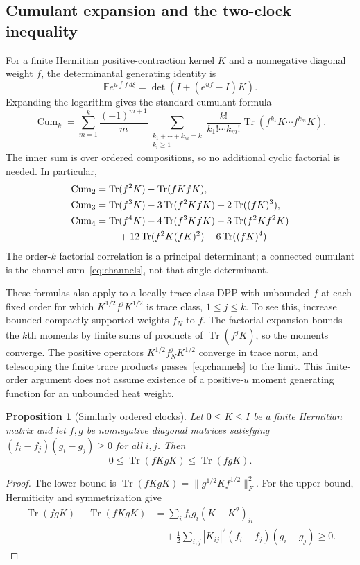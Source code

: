 \documentclass[11pt,a4paper]{article}
\newtheorem{proposition}[theorem]{Proposition}
\theoremstyle{remark}\newtheorem{remark}[theorem]{Remark}
\newcommand{\E}{\mathbb E}
\newcommand{\Tr}{\operatorname{Tr}}
\newcommand{\Cum}{\operatorname{Cum}}
\begin{document}
\subsection{Cumulant expansion and the two-clock inequality}
For a finite Hermitian positive-contraction kernel $K$ and a nonnegative diagonal weight $f$, the determinantal generating identity is
\begin{equation}
 \E e^{u\int f\,d\xi}=\det(I+(e^{uf}-I)K).
\end{equation}
Expanding the logarithm gives the standard cumulant formula~\citep{Soshnikov2000}
\begin{equation}\label{eq:channels}
 \Cum_k=\sum_{m=1}^k\frac{(-1)^{m+1}}m
 \sum_{\substack{k_1+\cdots+k_m=k\\k_i\ge1}}
 \frac{k!}{k_1!\cdots k_m!}
 \Tr(f^{k_1}K\cdots f^{k_m}K).
\end{equation}
The inner sum is over ordered compositions, so no additional cyclic factorial is needed.
In particular,
\begin{align}
 \Cum_2&=\Tr(f^2K)-\Tr(fKfK),\\
 \Cum_3&=\Tr(f^3K)-3\Tr(f^2KfK)+2\Tr((fK)^3),\\
 \Cum_4&=\Tr(f^4K)-4\Tr(f^3KfK)-3\Tr(f^2Kf^2K)\nonumber\\
 &\hspace{8mm}+12\Tr(f^2K(fK)^2)-6\Tr((fK)^4).
\end{align}
The order-$k$ factorial correlation is a principal determinant; a connected cumulant is the channel sum~\eqref{eq:channels}, not that single determinant.

These formulas also apply to a locally trace-class DPP with unbounded $f$ at each fixed order for which $K^{1/2}f^jK^{1/2}$ is trace class, $1\le j\le k$.
To see this, increase bounded compactly supported weights $f_N$ to $f$.
The factorial expansion bounds the $k$th moments by finite sums of products of $\Tr(f^jK)$, so the moments converge.
The positive operators $K^{1/2}f_N^jK^{1/2}$ converge in trace norm, and telescoping the finite trace products passes~\eqref{eq:channels} to the limit.
This finite-order argument does not assume existence of a positive-$u$ moment generating function for an unbounded heat weight.

\begin{proposition}[Similarly ordered clocks]\label{prop:ordered}
Let $0\le K\le I$ be a finite Hermitian matrix and let $f,g$ be nonnegative diagonal matrices satisfying $(f_i-f_j)(g_i-g_j)\ge0$ for all $i,j$.
Then
\begin{equation}\label{eq:ordered}
 0\le\Tr(fKgK)\le\Tr(fgK).
\end{equation}
\end{proposition}
\begin{proof}
The lower bound is $\Tr(fKgK)=\|g^{1/2}Kf^{1/2}\|_F^2$.
For the upper bound, Hermiticity and symmetrization give
\begin{align}
 \Tr(fgK)-\Tr(fKgK)
 &=\sum_i f_ig_i(K-K^2)_{ii}\nonumber\\
 &\quad+\frac12\sum_{i,j}|K_{ij}|^2(f_i-f_j)(g_i-g_j)\ge0.
\end{align}
\end{proof}
\end{document}
